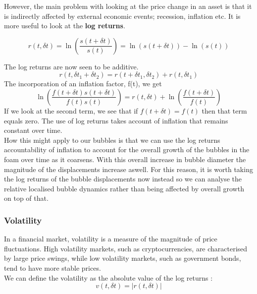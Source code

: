 However, the main problem with looking at the price change in an asset is that it is indirectly affected by external economic events; recession, inflation etc. It is more useful to look at the \textbf{log returns}.

\begin{equation}
    r(t, \delta t) = \ln\left(\frac{s(t+\delta t)}{s(t)}\right) = \ln(s(t+\delta t)) - \ln(s(t))
    \label{eq:lr_def}
\end{equation}

The log returns are now seen to be additive.
\begin{equation}
    r(t, \delta t_1 + \delta t_2) = r(t+\delta t_1, \delta t_2) + r(t, \delta t_1)
\end{equation}
The incorporation of an inflation factor, f(t), we get
\begin{equation}
    \ln\left(\frac{f(t+\delta t)s(t+\delta t)}{f(t)s(t)}\right) = r(t, \delta t) + \ln\left(\frac{f(t+\delta t)}{f(t)}\right)
\end{equation}
If we look at the second term, we see that if $f(t+\delta t) = f(t)$ then that term equals zero. The use of log returns takes account of inflation that remains constant over time. \cite{richmond2013econophysics}\\

How this might apply to our bubbles is that we can use the log returns accountability of inflation to account for the overall growth of the bubbles in the foam over time as it coarsens. With this overall increase in bubble diameter the magnitude of the displacements increase aswell. For this reason, it is worth taking the log returns of the bubble displacements now instead so we can analyse the relative localised bubble dynamics rather than being affected by overall growth on top of that.

\subsubsection{Volatility}
In a financial market, volatility is a measure of the magnitude of price fluctuations. High volatility markets, such as cryptocurrencies, are characterised by large price swings, while low volatility markets, such as government bonds, tend to have more stable prices.\\

We can define the volatility as the absolute value of the log returns \cite{richmond2013econophysics}:
\begin{equation}
    v(t, \delta t) = |r(t, \delta t)|
\end{equation}

